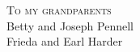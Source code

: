\cleardoublepage
{}
{}
\vspace*{.1\textheight}
\begin{center}
\textsc{To my grandparents}\\
Betty and Joseph Pennell\\
Frieda and Earl Harder
\end{center}
